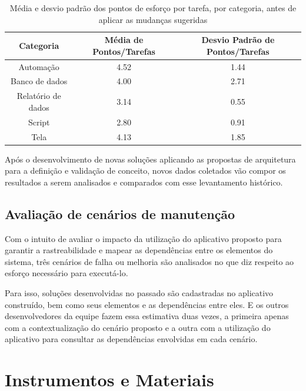 	\begin{table}[!htb]
		\centering
		\begin{tabular}{ccc}
			\toprule
			\textbf{Categoria} & \textbf{Média de Pontos/Tarefas} & \textbf{Desvio Padrão de Pontos/Tarefas} \\
			\midrule
			Automação          & 4.52                             & 1.44                               \\
			Banco de dados     & 4.00                             & 2.71                               \\
			Relatório de dados & 3.14                             & 0.55                               \\
			Script             & 2.80                             & 0.91                               \\
			Tela               & 4.13                             & 1.85                               \\
			\bottomrule
		\end{tabular}
		\caption{Média e desvio padrão dos pontos de esforço por tarefa, por categoria, antes de aplicar as mudanças sugeridas}
		\label{tab:media_desvio_historico}
	\end{table}
	
	Após o desenvolvimento de novas soluções aplicando as propostas de arquitetura para a definição e validação de conceito, novos dados coletados vão compor os resultados a serem analisados e
	comparados com esse levantamento histórico.

	\subsection{Avaliação de cenários de manutenção}

	Com o intuito de avaliar o impacto da utilização do aplicativo proposto para garantir a rastreabilidade e mapear as dependências entre os elementos do sistema, três cenários de falha ou melhoria
	são analisados no que diz respeito ao esforço necessário para executá-lo.

	Para isso, soluções desenvolvidas no passado são cadastradas no aplicativo construído, bem como seus elementos e as dependências entre eles. E os outros desenvolvedores da equipe fazem essa estimativa
	duas vezes, a primeira apenas com a contextualização do cenário proposto e a outra com a utilização do aplicativo para consultar as dependências envolvidas em cada cenário.

	
	\section{Instrumentos e Materiais}

